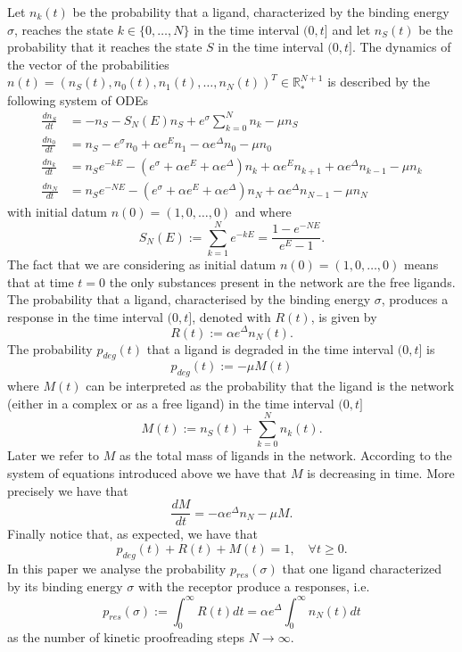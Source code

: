 \documentclass{article}
\numberwithin{equation}{section}
\theoremstyle{plain}
\begin{document}
Let $n_k (t) $ be the probability  that a ligand, characterized by the binding energy $\sigma$, reaches the state $k \in \{ 0, \dots , N\} $ in the time interval $(0, t ] $ and let $n_S (t) $ be the probability that it reaches the state $S$ in the time interval $(0, t ] $. 
The dynamics of the vector of the probabilities $n(t)=(n_S(t), n_0(t), n_1(t), \dots , n_N(t) )^T \in \mathbb R_*^{N+1}$ is described by the following system of ODEs 
\begin{align}\label{ODEs}
    \frac{d n_S }{dt} &= - n_S  - S_N(E) n_S + e^{\sigma }  \sum_{k=0}^{N} n_k - \mu n_S \nonumber \\
    \frac{d n_0 }{dt} &= n_S  - e^{\sigma } n_0 + \alpha e^E n_1 - \alpha e^{\Delta} n_0 - \mu n_0 \nonumber \\
        \frac{d n_k }{dt} &= n_S e^{- k E} - \left( e^{\sigma } + \alpha e^E + \alpha e^\Delta  \right)  n_k + \alpha e^E n_{k+1}  + \alpha e^{\Delta} n_{k-1} - \mu n_k  \\
         \frac{d n_{N} }{dt} &= n_S e^{- N E} - \left( e^{\sigma } + \alpha e^E + \alpha e^\Delta  \right)  n_{N} + \alpha e^{\Delta} n_{N-1} - \mu n_{N} \nonumber  
\end{align}
with initial datum $n(0)=(1, 0, \dots, 0)$ and 
where 
\[
S_N(E):=\sum_{k=1}^{N} e^{- k E } = \frac{1-e^{-NE}}{e^E-1 } . 
\]
The fact that we are considering as initial datum $n(0)=(1, 0, \dots, 0)$ means that at time $t=0$ the only substances present in the network are the free ligands. 
The probability that a ligand, characterised by the binding energy $\sigma$, produces a response in the time interval $(0,t]$, denoted with $R(t)$, is given by 
\[ 
R(t) := \alpha e^\Delta n_N(t). 
\]
The probability $p_{deg} (t)$ that a ligand is degraded in the time interval $(0, t] $ is 
\[
p_{deg} (t)  := - \mu M(t)  
\]
where $M(t)$ can be interpreted as the probability that the ligand is the network (either in a complex or as a free ligand) in the time interval $(0, t] $ 
\begin{equation} \label{def M}
M(t):=n_S(t) +\sum_{k=0}^{N} n_k (t) .
\end{equation}
Later we refer to $M $ as the total mass of ligands in the network. 
According to the system of equations introduced above we have that $M$ is decreasing in time. More precisely we have that 
\begin{equation} \label{mass}
\frac{d M }{ dt } = - \alpha e^\Delta n_{N} - \mu M . 
\end{equation}
Finally notice that, as expected, we have that
\[ 
p_{deg}(t) + R(t) + M(t)=1, \quad  \forall t \geq 0. 
\]
In this paper we analyse the probability  $p_{res}(\sigma)$ that one ligand characterized by its binding energy $\sigma $ with the receptor produce a responses, i.e.   
\begin{equation} \label{prob response}
p_{res} (\sigma ) := \int_0^\infty R(t) dt =  \alpha e^\Delta \int_0^\infty n_{N} (t) dt
\end{equation} as the number of kinetic proofreading steps $N \to \infty $. 
\end{document}
